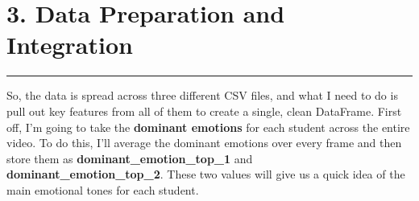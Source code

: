 \documentclass{article}
\newcommand{\highlight}[1]{\textsf{\textbf{#1}}}  %
\begin{document}
\section{3. Data Preparation and Integration}

  \begin{center}
        \color{red}\rule{1\linewidth}{1mm}
    \end{center}
    
So, the data is spread across three different CSV files, and what I need to do is pull out key features from all of them to create a single, clean DataFrame.
\noindent\sffamily
First off, I’m going to take the \highlight{dominant emotions} for each student across the entire video. To do this, I’ll average the dominant emotions over every frame and then store them as \highlight{dominant\_emotion\_top\_1} and \highlight{dominant\_emotion\_top\_2}. These two values will give us a quick idea of the main emotional tones for each student.
\end{document}
